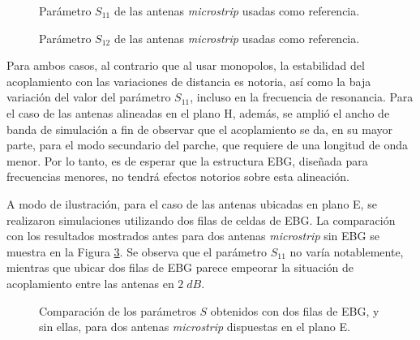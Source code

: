 \begin{figure}[H]
	\centering 
	\caption{Parámetro $S_{11}$ de las antenas \textit{microstrip} usadas como referencia.}
	\label{fig:sinebg-s11-microstrip}
\end{figure}



\begin{figure}[H]
	\centering 
	\caption{Parámetro $S_{12}$ de las antenas \textit{microstrip} usadas como referencia.}
	\label{fig:sinebg-s12-microstrip}
\end{figure}

Para ambos casos, al contrario que al usar monopolos, la estabilidad del acoplamiento con las variaciones de distancia es notoria, así como la baja variación del valor del parámetro $S_{11}$, incluso en la frecuencia de resonancia. Para el caso de las antenas alineadas en el plano H, además, se amplió el ancho de banda de simulación a fin de observar que el acoplamiento se da, en su mayor parte, para el modo secundario del parche, que requiere de una longitud de onda menor. Por lo tanto, es de esperar que la estructura EBG, diseñada para frecuencias menores, no tendrá efectos notorios sobre esta alineación.


A modo de ilustración, para el caso de las antenas ubicadas en plano E, se realizaron simulaciones utilizando dos filas de celdas de EBG. La comparación con los resultados mostrados antes para dos antenas \textit{microstrip} sin EBG se muestra en la Figura \ref{fig:planoh-2ebg-comparacion}. Se observa que el parámetro $S_{11}$ no varía notablemente, mientras que ubicar dos filas de EBG parece empeorar la situación de acoplamiento entre las antenas en $2\; dB$.

\begin{figure}[H]
	\centering 
	\caption{Comparación de los parámetros $S$ obtenidos con dos filas de EBG, y sin ellas, para dos antenas \textit{microstrip} dispuestas en el plano E.}
	\label{fig:planoh-2ebg-comparacion}
\end{figure}

